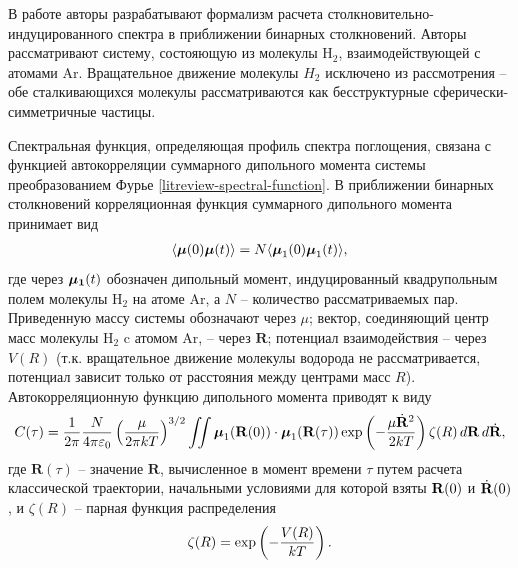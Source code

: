 В работе \cite{kranendonk1973} авторы разрабатывают формализм расчета столкновительно-индуци\-рован\-ного спектра в приближении бинарных столкновений. Авторы рассматривают систему, состояющую из молекулы H$_2$, взаимодействующей с атомами Ar. Вращательное движение молекулы $H_2$ исключено из рассмотрения -- обе сталкивающихся молекулы рассматриваются как бесструктурные сферически-симметричные частицы. \par
Спектральная функция, определяющая профиль спектра поглощения, связана с функцией автокорреляции суммарного дипольного момента системы преобразованием Фурье \eqref{litreview-spectral-function}. В приближении бинарных столкновений корреляционная функция суммарного дипольного момента принимает вид 
\begin{gather}
    \langle  \boldsymbol{\mu}(0) \boldsymbol{\mu}(t)  \rangle = N \langle  \boldsymbol{\mu}_1(0) \boldsymbol{\mu}_1(t)  \rangle,
\end{gather} 
%
где через $\boldsymbol{\mu_1}(t)$ обозначен дипольный момент, индуцированный квадрупольным полем молекулы H$_2$ на атоме Ar, а $N$ -- количество рассматриваемых пар. Приведенную массу системы обозначают через $\mu$; вектор, соединяющий центр масс молекулы H$_2$ c атомом Ar, -- через $\mathbf{R}$; потенциал взаимодействия -- через $V(R)$ (т.к. вращательное движение молекулы водорода не рассматривается, потенциал зависит только от расстояния между центрами масс $R$). Автокорреляционную функцию дипольного момента приводят к виду 
\begin{gather}
    C(\tau) = \frac{1}{2 \pi} \frac{N}{4 \pi \varepsilon_0} \left( \frac{\mu}{2 \pi k T} \right)^{3/2} \iint \boldsymbol{\mu}_1(\mathbf{R}(0)) \cdot \boldsymbol{\mu}_1(\mathbf{R}(\tau)) \exp \left( -\frac{\mu \dot{\mathbf{R}}^2}{2 k T} \right) \zeta(R) \, d \mathbf{R} \, d \dot{\mathbf{R}}, \label{kranendonk-correlation-function}
\end{gather}
%
где $\mathbf{R}(\tau)$ -- значение $\mathbf{R}$, вычисленное в момент времени $\tau$ путем расчета классической траектории, начальными условиями для которой взяты $\mathbf{R}(0)$ и $\dot{\mathbf{R}}(0)$, и $\zeta(R)$ -- парная функция распределения 
\begin{gather}
    \zeta(R) = \exp \left( -\frac{V(R)}{kT} \right).
\end{gather}

